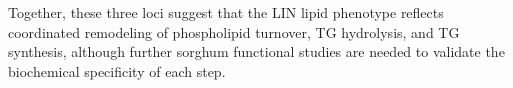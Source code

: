 \documentclass[9pt,twocolumn,twoside]{rilabRxiv}
\begin{document}
Together, these three loci suggest that the LIN lipid phenotype reflects coordinated remodeling of phospholipid turnover, TG hydrolysis, and TG synthesis, although further sorghum functional studies are needed to validate the biochemical specificity of each step.


\end{document}
